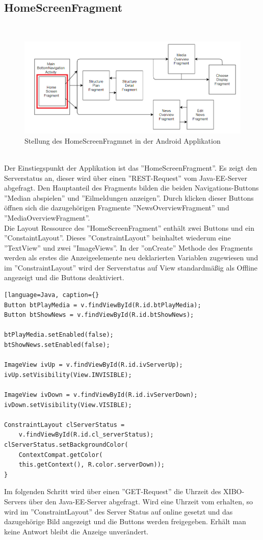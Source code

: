 \subsection{HomeScreenFragment}
\\
\begin{figure}[H]
\centering
\includegraphics[width=1.0\textwidth]{images/06_AndroidApp/06_AndroidArchHomeScreen}
\caption{Stellung des HomeScreenFragmnet in der Android Applikation}
\label{fig:mediaNav}
\end{figure}
\\
Der Einstiegspunkt der Applikation ist das ''HomeScreenFragment''. Es zeigt den Serverstatus an, dieser wird über einen ''REST-Request'' vom Java-EE-Server abgefragt. Den Hauptanteil des Fragments bilden die beiden Navigations-Buttons ''Median abspielen'' und ''Eilmeldungen anzeigen''. Durch klicken dieser Buttons öffnen sich die dazugehörigen Fragmente ''NewsOverviewFragment'' und ''MediaOverviewFragment''.
\\
Die Layout Ressource des ''HomeScreenFragment'' enthält zwei Buttons und ein ''ConstaintLayout''. Dieses ''ConstraintLayout'' beinhaltet wiederum eine ''TextView'' und zwei ''ImageViews''. In der ''onCreate'' Methode des Fragments werden als erstes die Anzeigeelemente neu deklarierten Variablen zugewiesen und im ''ConstraintLayout'' wird der Serverstatus auf View standardmäßig als Offline angezeigt und die Buttons deaktiviert.
\begin{lstlisting}[language=Java, caption={}
Button btPlayMedia = v.findViewById(R.id.btPlayMedia);
Button btShowNews = v.findViewById(R.id.btShowNews);

btPlayMedia.setEnabled(false);
btShowNews.setEnabled(false);
    
ImageView ivUp = v.findViewById(R.id.ivServerUp);
ivUp.setVisibility(View.INVISIBLE);
    
ImageView ivDown = v.findViewById(R.id.ivServerDown);    
ivDown.setVisibility(View.VISIBLE);
    
ConstraintLayout clServerStatus = 
    v.findViewById(R.id.cl_serverStatus);
clServerStatus.setBackgroundColor(
    ContextCompat.getColor(
    this.getContext(), R.color.serverDown));
}
\end{lstlisting}
Im folgenden Schritt wird über einen ''GET-Request'' die Uhrzeit des XIBO-Servers über den Java-EE-Server abgefragt. Wird eine Uhrzeit vom erhalten, so wird im ''ConstraintLayout'' des Server Status auf online gesetzt und das dazugehörige Bild angezeigt und die Buttons werden freigegeben. Erhält man keine Antwort bleibt die Anzeige unverändert.

